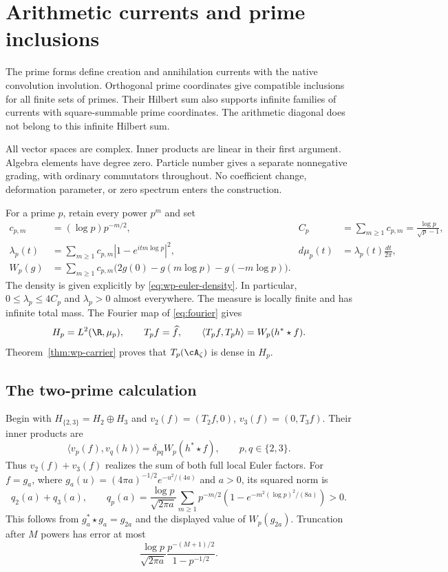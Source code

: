 \section{Arithmetic currents and prime inclusions}
\label{sec:wc-currents}

The prime forms define creation and annihilation currents with the native
convolution involution.  Orthogonal prime coordinates give compatible
inclusions for all finite sets of primes.  Their Hilbert sum also supports
infinite families of currents with square-summable prime coordinates.
The arithmetic diagonal does not belong to this infinite Hilbert sum.

All vector spaces are complex.  Inner products are linear in their first
argument.  Algebra elements have degree zero.  Particle number gives a
separate nonnegative grading, with ordinary commutators throughout.
No coefficient change, deformation parameter, or zero spectrum enters
the construction.

For a prime $p$, retain every power $p^m$ and set
\begin{equation}
 \begin{aligned}
 c_{p,m}&=(\log p)p^{-m/2},&
 C_p&=\sum_{m\geq1}c_{p,m}=\frac{\log p}{\sqrt p-1},\\
 \lambda_p(t)&=\sum_{m\geq1}c_{p,m}|1-e^{itm\log p}|^2,&
 d\mu_p(t)&=\lambda_p(t)\frac{dt}{2\pi},\\
 W_p(g)&=\sum_{m\geq1}c_{p,m}
 \bigl(2g(0)-g(m\log p)-g(-m\log p)\bigr).
 \end{aligned}
 \label{eq:wc-local-data}
\end{equation}
The density is given explicitly by \eqref{eq:wp-euler-density}.
In particular, $0\leq\lambda_p\leq4C_p$ and $\lambda_p>0$ almost
everywhere.  The measure is locally finite and has infinite total mass.
The Fourier map of \eqref{eq:fourier} gives
\[
 H_p=L^2(\R,\mu_p),\qquad
 T_p f=\widehat f,\qquad
 \langle T_pf,T_ph\rangle=W_p(h^*\star f).
\]
Theorem~\ref{thm:wp-carrier} proves that $T_p(\cA_\zeta)$ is dense in $H_p$.

\subsection{The two-prime calculation}

Begin with $H_{\{2,3\}}=H_2\oplus H_3$ and
$v_2(f)=(T_2f,0)$, $v_3(f)=(0,T_3f)$.
Their inner products are
\begin{equation}
 \langle v_p(f),v_q(h)\rangle
 =\delta_{pq}W_p(h^*\star f),\qquad p,q\in\{2,3\}.
 \label{eq:wc-two-prime-covariance}
\end{equation}
Thus $v_2(f)+v_3(f)$ realizes the sum of both full local Euler factors.
For $f=g_a$, where
$g_a(u)=(4\pi a)^{-1/2}e^{-u^2/(4a)}$ and $a>0$, its squared norm is
\begin{equation}
 q_2(a)+q_3(a),\qquad
 q_p(a)=\frac{\log p}{\sqrt{2\pi a}}
 \sum_{m\geq1}p^{-m/2}
 \left(1-e^{-m^2(\log p)^2/(8a)}\right)>0.
 \label{eq:wc-gaussian-norm}
\end{equation}
This follows from $g_a^*\star g_a=g_{2a}$ and the displayed value of
$W_p(g_{2a})$.  Truncation after $M$ powers has error at most
\[
 \frac{\log p}{\sqrt{2\pi a}}
 \frac{p^{-(M+1)/2}}{1-p^{-1/2}}.
\]

